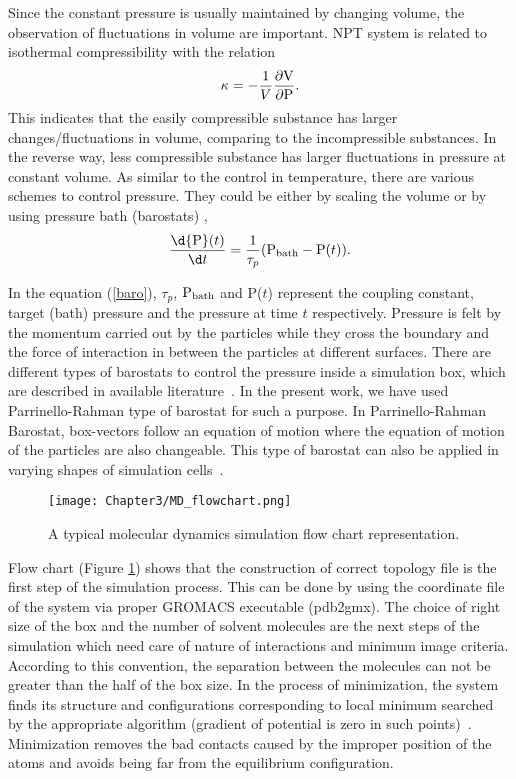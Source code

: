 Since the constant pressure is usually maintained by changing volume, the observation of fluctuations in volume are important. NPT system is related to isothermal compressibility with the relation
\begin{equation}
\kappa  = - \frac{1}{V} \frac{{\partial}{\rm V}}{{\partial} {\rm P}} .
\end{equation}
This indicates that the easily compressible substance has larger changes/fluctuations in volume, comparing to the incompressible substances. In the reverse way, less compressible substance has larger fluctuations in pressure at constant volume. As similar to the control in temperature, there are various schemes to control pressure. They could be either by scaling the volume or by using pressure bath (barostats) \citep{Gromacs-manual}, 
\begin{equation}
\frac{\d{\rm P}(t)}{\d t}  =  \frac{1}{\tau_p} ( {\rm P}_{\rm bath} - {\rm P}(t)). 
\label{baro}
\end{equation}
\begin{sloppypar}
In the equation (\ref{baro}), $\tau _p$, ${\rm P}_{\rm bath}$ and P($t$) represent the coupling constant, target (bath) pressure and the pressure at time $t$ respectively. Pressure is felt by the momentum carried out by the particles while they cross the boundary and the force of interaction in between the particles at different surfaces. There are different types of barostats to control the pressure inside a simulation box, which are described in available literature~\citep{Parrinello1981, Melchionna1993, Andersen1980}. In the present work, 
we have used Parrinello-Rahman type of barostat for such a purpose. In Parrinello-Rahman Barostat, box-vectors follow an equation of motion where the equation of motion of the particles are also changeable. This type of barostat can also be applied in varying shapes of simulation cells~\citep{Parrinello1981}.
\end{sloppypar}

\begin{figure}[h!]
\centering
\texttt{[image: Chapter3/MD\_flowchart.png]}
\caption{A typical molecular dynamics simulation flow chart representation.}
\label{md_flow}
\end{figure}

Flow chart (Figure \ref{md_flow}) shows that the construction of correct topology file is the first step of the simulation process. This can be done by using the coordinate file of the system via proper GROMACS executable (pdb2gmx). The choice of right size of the box and the number of solvent molecules are the next steps of the simulation which need care of nature of interactions and minimum image criteria. According to this convention, the separation between the molecules can not be greater than the half of the box size. In the process of minimization, the system finds its structure and configurations corresponding to local minimum searched by the appropriate algorithm (gradient of potential is zero in such points)~\citep{Gromacs-manual}. Minimization removes the bad contacts caused by the improper position of the atoms and avoids being far from the equilibrium configuration.
